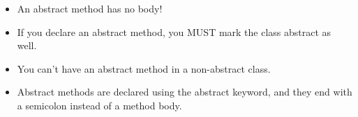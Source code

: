 \setlength{\columnsep}{3pt}
\begin{flushleft}

	\begin{itemize}
		\item An abstract method has no body!
		\item If you declare an abstract method, you MUST mark the class abstract as well. \item You can’t have an abstract method in a non-abstract class.
		\item Abstract methods are declared using the abstract keyword, and they end with a semicolon instead of a method body.
		\bigskip
		\bigskip
		

\end{itemize}
\end{flushleft}
